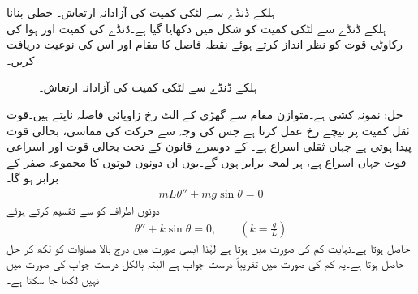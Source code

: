 \quad ہلکے ڈنڈے سے لٹکی کمیت کی آزادانہ ارتعاش۔ خطی بنانا\\
ہلکے ڈنڈے سے لٹکی کمیت کو شکل  میں دکھایا گیا ہے۔ڈنڈے کی کمیت اور ہوا کی رکاوٹی قوت کو نظر انداز کرتے ہوئے نقطہ فاصل کا مقام اور اس کی نوعیت دریافت کریں۔
\begin{figure}
\centering
{}
\caption{ہلکے ڈنڈے سے لٹکی کمیت کی آزادانہ ارتعاش۔}
\label{شکل_مثال_نظام_دھاگے_سے_لٹکی_کمیت}
\end{figure}

حل:\quad {} نمونہ کشی ہے۔متوازن مقام سے گھڑی کے الٹ رخ زاویائی فاصلہ  ناپتے ہیں۔قوت ثقل  کمیت پر نیچے رخ عمل کرتا ہے جس کی وجہ سے حرکت کی مماسی، بحالی قوت   پیدا ہوتی ہے جہاں  ثقلی اسراع ہے۔ کے دوسرے قانون کے تحت بحالی قوت اور اسراعی  قوت  جہاں  اسراع ہے، ہر لمحہ برابر ہوں گے۔یوں ان دونوں قوتوں کا مجموعہ صفر کے برابر ہو گا۔
\begin{align*}
mL\theta''+mg\sin \theta=0
\end{align*}
دونوں اطراف کو  سے تقسیم کرتے ہوئے
\begin{align}\label{مساوات_نظام_غیر_خطی_ترکیب_مرحلہ_ت}
\theta''+k\sin \theta=0,\quad \quad \left(k=\frac{g}{L}\right)
\end{align}
حاصل ہوتا ہے۔نہایت کم  کی صورت میں  ہوتا ہے لہٰذا ایسی صورت میں درج بالا مساوات کو  لکھ کر حل  حاصل ہوتا ہے۔یہ کم  کی صورت میں تقریباً درست جواب ہے البتہ بالکل درست جواب  کی صورت میں نہیں لکھا جا سکتا ہے۔

